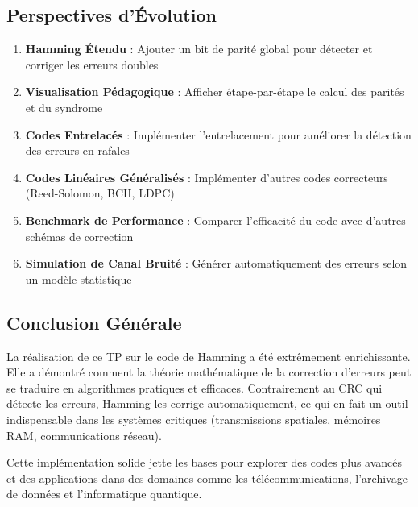 \documentclass[12pt, a4paper]{article}
\begin{document}
\subsection{Perspectives d'Évolution}

\begin{enumerate}
    \item \textbf{Hamming Étendu} : Ajouter un bit de parité global pour détecter et corriger les erreurs doubles
    \item \textbf{Visualisation Pédagogique} : Afficher étape-par-étape le calcul des parités et du syndrome
    \item \textbf{Codes Entrelacés} : Implémenter l'entrelacement pour améliorer la détection des erreurs en rafales
    \item \textbf{Codes Linéaires Généralisés} : Implémenter d'autres codes correcteurs (Reed-Solomon, BCH, LDPC)
    \item \textbf{Benchmark de Performance} : Comparer l'efficacité du code avec d'autres schémas de correction
    \item \textbf{Simulation de Canal Bruité} : Générer automatiquement des erreurs selon un modèle statistique
\end{enumerate}

\subsection{Conclusion Générale}

La réalisation de ce TP sur le code de Hamming a été extrêmement enrichissante. Elle a démontré comment la théorie mathématique de la correction d'erreurs peut se traduire en algorithmes pratiques et efficaces. Contrairement au CRC qui détecte les erreurs, Hamming les corrige automatiquement, ce qui en fait un outil indispensable dans les systèmes critiques (transmissions spatiales, mémoires RAM, communications réseau).

Cette implémentation solide jette les bases pour explorer des codes plus avancés et des applications dans des domaines comme les télécommunications, l'archivage de données et l'informatique quantique.
\end{document}
